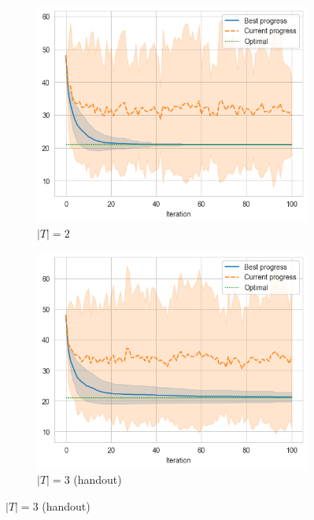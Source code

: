 \begin{figure}[ht]
    \centering
    \hfill
    \begin{subfigure}{0.32\textwidth}
        \centering
        \includegraphics[width=\textwidth]{../images/p1/added24s.png}
        \caption{\(|T| = 2\)}
    \end{subfigure}
    \hfill
    \begin{subfigure}{0.32\textwidth}
        \centering
        \includegraphics[width=\textwidth]{../images/p1/added34s.png}
        \caption{\(|T| = 3\) (handout)}
    \end{subfigure}
    \hfill

\end{figure}

